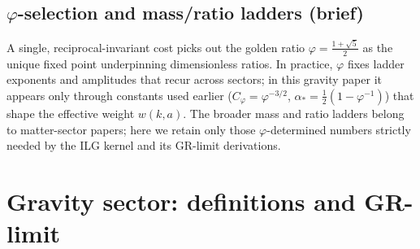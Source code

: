 \documentclass[12pt,a4paper]{article}
\begin{document}
\subsection{\texorpdfstring{\(\varphi\)}{phi}-selection and mass/ratio ladders (brief)}
A single, reciprocal-invariant cost picks out the golden ratio \(\varphi=\tfrac{1+\sqrt{5}}{2}\) as the unique fixed point underpinning dimensionless ratios. In practice, \(\varphi\) fixes ladder exponents and amplitudes that recur across sectors; in this gravity paper it appears only through constants used earlier (\(C_\varphi=\varphi^{-3/2}\), \(\alpha_*=\tfrac12(1-\varphi^{-1})\)) that shape the effective weight \(w(k,a)\). The broader mass and ratio ladders belong to matter-sector papers; here we retain only those \(\varphi\)-determined numbers strictly needed by the ILG kernel and its GR-limit derivations.

\section{Gravity sector: definitions and GR-limit}
\end{document}

